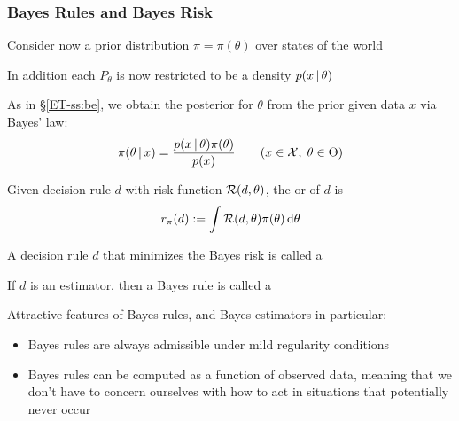 \begin{frame}\frametitle{Bayes Rules and Bayes Risk}

    \vspace{2em}
    Consider now a prior distribution $\pi = \pi(\theta)$ over states of the world
    
    In addition each $P_\theta$ is now restricted to be a density $p(x \, | \,
    \theta)$
    
    \vspace{.7em}
    As in \S\ref{ET-ss:be}, we obtain the posterior for $\theta$ from the prior
    given data $x$ via Bayes' law:
    \begin{equation*}
        \pi(\theta \, | \, x) 
        = \frac{p(x \, | \, \theta) \pi(\theta)} {p(x)}
        \qquad 
        (x \in \mathcal X, \; \theta \in \Theta)
    \end{equation*}
    
\end{frame}

\begin{frame}

    \vspace{2em}
    Given decision rule $d$ with risk function $\mathcal R(d, \theta)$, 
    the  or  of $d$ is 
    \begin{equation*}
        r_\pi(d) := \int \mathcal R(d, \theta) \pi(\theta) \mathop{}\!\mathrm{d} \theta
    \end{equation*}
    
    \vspace{.7em}
    A decision rule $d$ that minimizes the Bayes risk is called a 
    
    If $d$ is an estimator, then a Bayes rule is called a 
    
\end{frame}

\begin{frame}

    \vspace{2em}
    Attractive features of Bayes rules, and Bayes
    estimators in particular:
    
    \begin{itemize}
        \item Bayes rules are always admissible under
                mild regularity conditions
        \item Bayes rules can be computed
                as a function of observed data, meaning that we don't have to concern
                ourselves with how to act in situations that potentially never occur
    \end{itemize}
    
\end{frame}

